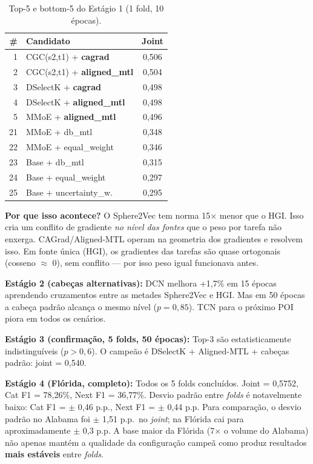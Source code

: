 \documentclass[12pt,a4paper]{article}
\begin{document}
\begin{table}[H]
\centering
\small
\caption{Top-5 e bottom-5 do Estágio 1 (1 fold, 10 épocas).}
\begin{tabular}{rlc}
\toprule
\textbf{\#} & \textbf{Candidato} & \textbf{Joint} \\
\midrule
1 & CGC(s2,t1) + \textbf{cagrad} & 0,506 \\
2 & CGC(s2,t1) + \textbf{aligned\_mtl} & 0,504 \\
3 & DSelectK + \textbf{cagrad} & 0,498 \\
4 & DSelectK + \textbf{aligned\_mtl} & 0,498 \\
5 & MMoE + \textbf{aligned\_mtl} & 0,496 \\
\arrayrulecolor{black!30}\midrule\arrayrulecolor{black}
21 & MMoE + db\_mtl & 0,348 \\
22 & MMoE + equal\_weight & 0,346 \\
23 & Base + db\_mtl & 0,315 \\
24 & Base + equal\_weight & 0,297 \\
25 & Base + uncertainty\_w. & 0,295 \\
\bottomrule
\end{tabular}
\end{table}

\textbf{Por que isso acontece?} O Sphere2Vec tem norma 15$\times$ menor que o HGI. Isso cria um conflito de gradiente \textit{no nível das fontes} que o peso por tarefa não enxerga. CAGrad/Aligned-MTL operam na geometria dos gradientes e resolvem isso. Em fonte única (HGI), os gradientes das tarefas são quase ortogonais (cosseno $\approx$ 0), sem conflito --- por isso peso igual funcionava antes.

\textbf{Estágio 2 (cabeças alternativas):} DCN melhora +1,7\% em 15 épocas aprendendo cruzamentos entre as metades Sphere2Vec e HGI. Mas em 50 épocas a cabeça padrão alcança o mesmo nível ($p = 0,85$). TCN para o próximo POI piora em todos os cenários.

\textbf{Estágio 3 (confirmação, 5 folds, 50 épocas):} Top-3 são estatisticamente indistinguíveis ($p > 0,6$). O campeão é DSelectK + Aligned-MTL + cabeças padrão: joint = 0,540.

\textbf{Estágio 4 (Flórida, completo):} Todos os 5 folds concluídos. Joint = 0,5752, Cat F1 = 78,26\%, Next F1 = 36,77\%. Desvio padrão entre \textit{folds} é notavelmente baixo: Cat F1 = $\pm$ 0,46 p.p., Next F1 = $\pm$ 0,44 p.p. Para comparação, o desvio padrão no Alabama foi $\pm$ 1,51 p.p.\ no \textit{joint}; na Flórida cai para aproximadamente $\pm$ 0,3 p.p. A base maior da Flórida (7$\times$ o volume do Alabama) não apenas mantém a qualidade da configuração campeã como produz resultados \textbf{mais estáveis} entre \textit{folds}.
\end{document}
